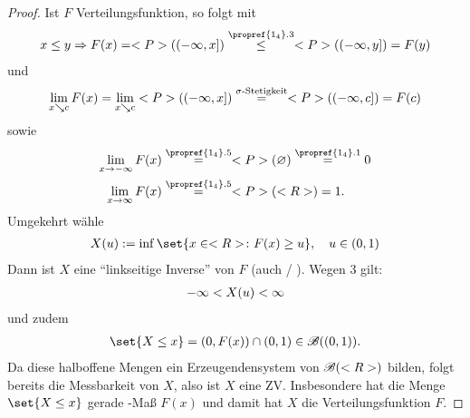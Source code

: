 \begin{proof}
	Ist $F$ Verteilungsfunktion, so folgt mit 
	\begin{align}
		 x \le y \Rightarrow F(x) = \probp((-\infty,x]) \overset{\propref{1_4}.3}{\le} \probp((-\infty,y]) = F(y)\notag
	\end{align}
	und
	\begin{align}
		\lim_{x \searrow c} F(x) = \lim_{x \searrow c} <P>((-\infty, x]) \overset{\sigma\text{-Stetigkeit}}{=} <P>((-\infty, c]) = F(c)\notag
	\end{align}
	sowie
	\begin{align}
		\lim_{x\to -\infty} F(x) &\overset{\propref{1_4}.5}{=} \probp(\emptyset) \overset{\propref{1_4}.1}{=} 0\notag\\
		\lim_{x\to \infty} F(x) &\overset{\propref{1_4}.5}{=} \probp(\R) = 1.\notag
	\end{align}
	Umgekehrt wähle
	\begin{align}
		X(u) := \inf\set{x \in \R \colon F(x) \ge u}, \quad u \in (0,1)\notag
	\end{align}
	Dann ist $X$ eine ``linkseitige Inverse'' von $F$ (auch  / ).
	Wegen 3 gilt:
	\begin{align}
		-\infty < X(u) < \infty\notag
	\end{align}
	und zudem
	\begin{align}
		\set{X \le x} = (0, F(x)) \cap (0,1) \in \borel((0,1)).\notag
	\end{align}
	Da diese halboffene Mengen ein Erzeugendensystem von $\mathscr{B}(<R>)$ bilden, folgt bereits die Messbarkeit von $X$, also ist $X$ eine ZV. Insbesondere hat die Menge $\set{X \le x}$ gerade -Maß $F(x)$ und damit hat $X$ die Verteilungsfunktion $F$.
\end{proof}

